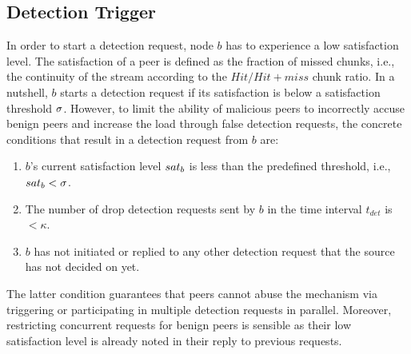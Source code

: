\subsection{Detection Trigger}
\label{Detection-Trigger}


In order to start a detection request, node $b$ has to experience a low satisfaction level. 
The satisfaction of a peer is defined as the fraction of missed chunks, i.e., the continuity of the stream according to the $Hit/Hit+miss$ chunk ratio.
In a nutshell, $b$ starts a detection request if its satisfaction is below a satisfaction threshold $\sigma$.
However, to limit the ability of malicious peers to incorrectly accuse benign peers and increase the load through false detection requests, the concrete conditions that result in a detection request from $b$ are: 


\begin{enumerate}
 \item $b$'s current satisfaction level $sat_b$ is less than the predefined threshold, i.e., $sat_b < \sigma$.
 \item The number of drop detection requests sent by $b$ in the time interval $t_{det}$ is $< \kappa$. 
 \item $b$ has not initiated or replied to any other \drop detection request that the source has not decided on yet.
\end{enumerate}
The latter condition guarantees that peers cannot abuse the mechanism via triggering or participating in multiple detection requests in parallel. 
Moreover, restricting concurrent requests for benign peers is sensible as their low satisfaction level is already noted in their reply to previous requests.

